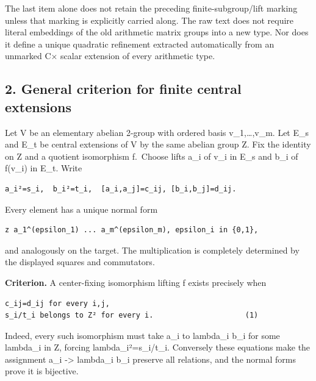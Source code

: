 The last item alone does not retain the preceding finite-subgroup/lift
marking unless that marking is explicitly carried along. The raw text
does not require literal embeddings of the old arithmetic matrix groups
into a new type. Nor does it define a unique quadratic refinement
extracted automatically from an unmarked C× scalar extension of every
arithmetic type.

\hypertarget{dyadic_markings-general-finite-central-extension-criterion}{%
\subsection{2. General criterion for finite central extensions}\label{dyadic_markings-general-finite-central-extension-criterion}}

Let V be an elementary abelian 2-group with ordered basis
v\_1,\ldots,v\_m. Let E\_s and E\_t be central extensions of V by the
same abelian group Z. Fix the identity on Z and a quotient isomorphism
f.~Choose lifts a\_i of v\_i in E\_s and b\_i of f(v\_i) in E\_t. Write

\begin{Verbatim}[fontsize=\small,breaklines=true,breakanywhere=true]
a_i²=s_i,  b_i²=t_i,  [a_i,a_j]=c_ij, [b_i,b_j]=d_ij.
\end{Verbatim}

Every element has a unique normal form

\begin{Verbatim}[fontsize=\small,breaklines=true,breakanywhere=true]
z a_1^(epsilon_1) ... a_m^(epsilon_m), epsilon_i in {0,1},
\end{Verbatim}

and analogously on the target. The multiplication is completely
determined by the displayed squares and commutators.

\textbf{Criterion.} A center-fixing isomorphism lifting f exists
precisely when

\begin{Verbatim}[fontsize=\small,breaklines=true,breakanywhere=true]
c_ij=d_ij for every i,j,
s_i/t_i belongs to Z² for every i.                     (1)
\end{Verbatim}

Indeed, every such isomorphism must take a\_i to lambda\_i b\_i for some
lambda\_i in Z, forcing lambda\_i²=s\_i/t\_i. Conversely these equations
make the assignment a\_i -\textgreater{} lambda\_i b\_i preserve all
relations, and the normal forms prove it is bijective.

